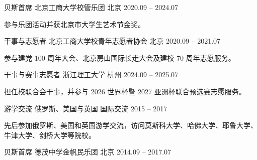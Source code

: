 
\begin{cventries}
  \cventry
    {贝斯首席}
    {北京工商大学校管乐团}
    {北京}
    {2020.09 -- 2024.07}
    {\begin{cvitems}\item {参与乐团活动并获北京市大学生艺术节金奖。}\end{cvitems}}

  \cventry
    {干事与志愿者}
    {北京工商大学校青年志愿者协会}
    {北京}
    {2020.09 -- 2021.07}
    {\begin{cvitems}\item {参与建党 100 周年大会、北京房山国际长走大会及建校 70 周年志愿服务。}\end{cvitems}}

  \cventry
    {干事与赛事志愿者}
    {浙江理工大学}
    {杭州}
    {2024.09 -- 2025.07}
    {\begin{cvitems}\item {担任校联合会干事，并参与 2026 世界杯暨 2027 亚洲杯联合预选赛志愿服务。}\end{cvitems}}

  \cventry
    {游学交流}
    {俄罗斯、美国与英国}
    {国际交流}
    {2015 -- 2017}
    {\begin{cvitems}\item {先后参加俄罗斯、美国和英国游学交流，访问莫斯科大学、哈佛大学、耶鲁大学、牛津大学、剑桥大学等院校。}\end{cvitems}}

  \cventry
    {贝斯首席}
    {德茂中学金帆民乐团}
    {北京}
    {2014.09 -- 2017.07}
    {}
\end{cventries}
